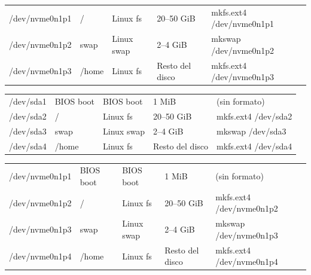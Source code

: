 \begin{tcolorbox}[title=Esquema MBR (BIOS legacy) — NVMe]
\begin{ttfamily}
  \begin{tabular}{lllll}
    {\color{blue}/dev/nvme0n1p1} & {\color{red}/}     & {\color{brown}Linux fs}   & 20--50 GiB       & {\color{orange}mkfs.ext4 /dev/nvme0n1p1} \\
    {\color{blue}/dev/nvme0n1p2} & {\color{red}swap}  & {\color{brown}Linux swap} & 2--4 GiB         & {\color{orange}mkswap /dev/nvme0n1p2} \\
    {\color{blue}/dev/nvme0n1p3} & {\color{red}/home} & {\color{brown}Linux fs}   & Resto del disco  & {\color{orange}mkfs.ext4 /dev/nvme0n1p3} \\
  \end{tabular}
\end{ttfamily}
\end{tcolorbox}

\begin{tcolorbox}[title=Esquema GPT con BIOS — SATA]
\begin{ttfamily}
  \begin{tabular}{lllll}
    {\color{blue}/dev/sda1} & {\color{red}BIOS boot} & {\color{brown}BIOS boot}  & 1 MiB            & {\color{orange}(sin formato)} \\
    {\color{blue}/dev/sda2} & {\color{red}/}         & {\color{brown}Linux fs}   & 20--50 GiB       & {\color{orange}mkfs.ext4 /dev/sda2} \\
    {\color{blue}/dev/sda3} & {\color{red}swap}      & {\color{brown}Linux swap} & 2--4 GiB         & {\color{orange}mkswap /dev/sda3} \\
    {\color{blue}/dev/sda4} & {\color{red}/home}     & {\color{brown}Linux fs}   & Resto del disco  & {\color{orange}mkfs.ext4 /dev/sda4} \\
  \end{tabular}
\end{ttfamily}
\end{tcolorbox}

\begin{tcolorbox}[title=Esquema GPT con BIOS — NVMe]
\begin{ttfamily}
  \begin{tabular}{lllll}
    {\color{blue}/dev/nvme0n1p1} & {\color{red}BIOS boot} & {\color{brown}BIOS boot}  & 1 MiB            & {\color{orange}(sin formato)} \\
    {\color{blue}/dev/nvme0n1p2} & {\color{red}/}         & {\color{brown}Linux fs}   & 20--50 GiB       & {\color{orange}mkfs.ext4 /dev/nvme0n1p2} \\
    {\color{blue}/dev/nvme0n1p3} & {\color{red}swap}      & {\color{brown}Linux swap} & 2--4 GiB         & {\color{orange}mkswap /dev/nvme0n1p3} \\
    {\color{blue}/dev/nvme0n1p4} & {\color{red}/home}     & {\color{brown}Linux fs}   & Resto del disco  & {\color{orange}mkfs.ext4 /dev/nvme0n1p4} \\
  \end{tabular}
\end{ttfamily}
\end{tcolorbox}

